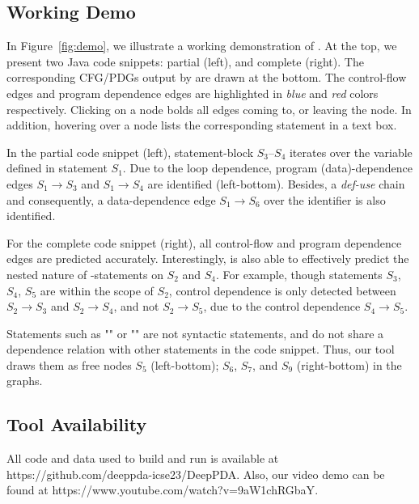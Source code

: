 \subsection{Working Demo}
In Figure~\ref{fig:demo}, we illustrate a working demonstration of \tool. At the top, we present two Java code snippets: partial (left), and complete (right). The corresponding CFG/PDGs output by \tool are drawn at the bottom. The control-flow edges and program dependence edges are highlighted in \textit{blue} and \textit{red} colors respectively. Clicking on a node bolds all edges coming to, or leaving the node. In addition, hovering over a node lists the corresponding statement in a text box.

In the partial code snippet (left), statement-block $S_3$--$S_4$ iterates over the variable  defined in statement $S_1$. Due to the loop dependence, program (data)-dependence edges $S_1{\rightarrow}S_3$ and $S_1{\rightarrow}S_4$ are identified (left-bottom). Besides, a \textit{def-use} chain and consequently, a data-dependence edge $S_1{\rightarrow}S_6$  over the identifier  is also identified.


For the complete code snippet (right), all control-flow and program dependence edges are predicted accurately. Interestingly, \tool is also able to effectively predict the nested nature of -statements on $S_2$ and $S_4$. For example, though statements $S_3$, $S_4$, $S_5$ are within the scope of $S_2$, control dependence is only detected between $S_2{\rightarrow}S_3$ and $S_2{\rightarrow}S_4$, and not $S_2{\rightarrow}S_5$, due to the control dependence $S_4{\rightarrow}S_5$.

Statements such as "\code{\{}" or "\code{\}}" are not syntactic statements, and do not share a dependence relation with other statements in the code snippet. Thus, our tool draws them as free nodes $S_5$ (left-bottom); $S_6$, $S_7$, and $S_9$ (right-bottom) in the graphs.

\subsection{Tool Availability}
All code and data used to build and run \tool is available at {https://github.com/deeppda-icse23/DeepPDA}. Also, our video demo can be found at {https://www.youtube.com/watch?v=9aW1chRGbaY}.